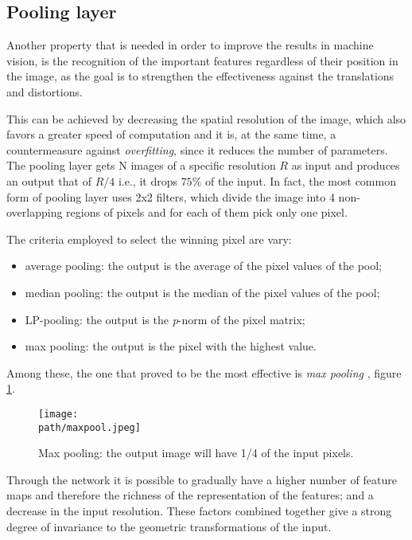\subsection {Pooling layer}
\label{subsec:pooling} 

Another property that is needed in order to improve the results in machine vision, is the recognition of the important features regardless of their position in the image, as the goal is to strengthen the effectiveness against the translations and distortions. 

This can be achieved by decreasing the spatial resolution of the image, which also favors a greater speed of computation and it is, at the same time, a countermeasure against \emph{overfitting}, since it reduces the number of parameters. The pooling layer gets N images of a specific resolution $R$ as input and produces an output that of $R/4$ i.e., it drops $75\%$ of the input. 
In fact, the most common form of pooling layer uses 2x2 filters, which divide the image into  4 non-overlapping regions of pixels and for each of them pick only one pixel. 

The criteria employed to select the winning pixel are vary:

\begin{itemize}
    \item average pooling: the output is the average of the pixel values of the pool;
    
    \item median pooling: the output is the median of the pixel values of the pool;
    
    \item LP-pooling: the output is the \emph{p}-norm of the pixel matrix;
    
    \item max pooling: the output is the pixel with the highest value.
\end{itemize}

Among these, the one that proved to be the most effective is \emph{max pooling} \parencite{WCS231layer}, figure \ref{fig:maxpool}.

\begin{figure}[h!]
 \centering
 \texttt{[image: \\path/maxpool.jpeg]} 
 \caption{Max pooling: the output image will have 1/4 of the input pixels.}
 \label{fig:maxpool}
\end{figure}

Through the network it is possible to gradually have a higher number of feature maps and therefore the richness of the representation of the features; and a decrease in the input resolution. These factors combined together give a strong degree of invariance to the geometric transformations of the input.

